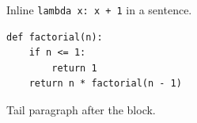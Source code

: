 \documentclass{article}
\begin{document}
Inline \texttt{lambda x: x + 1} in a sentence.

\begin{verbatim}
def factorial(n):
    if n <= 1:
        return 1
    return n * factorial(n - 1)
\end{verbatim}

Tail paragraph after the block.
\end{document}
